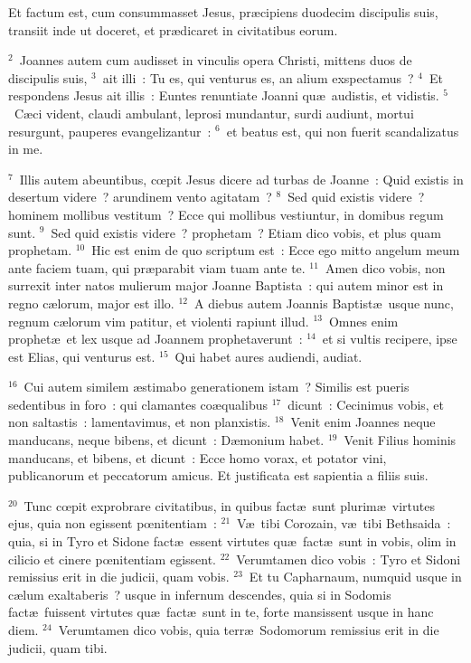 \lettrine[lines=10,image=true,loversize=0.05,lraise=-0.03]{E}{}t factum est, cum consummasset Jesus, pr\ae cipiens duodecim discipulis suis, transiit inde ut doceret, et pr\ae dicaret in civitatibus eorum.


${}^{2}$~Joannes autem cum audisset in vinculis opera Christi, mittens duos de discipulis suis,
${}^{3}$~ait illi~: Tu es, qui venturus es, an alium exspectamus~?
${}^{4}$~Et respondens Jesus ait illis~: Euntes renuntiate Joanni qu\ae\ audistis, et vidistis.
${}^{5}$~C\ae ci vident, claudi ambulant, leprosi mundantur, surdi audiunt, mortui resurgunt, pauperes evangelizantur~:
${}^{6}$~et beatus est, qui non fuerit scandalizatus in me.


${}^{7}$~Illis autem abeuntibus, cœpit Jesus dicere ad turbas de Joanne~: Quid existis in desertum videre~? arundinem vento agitatam~?
${}^{8}$~Sed quid existis videre~? hominem mollibus vestitum~? Ecce qui mollibus vestiuntur, in domibus regum sunt.
${}^{9}$~Sed quid existis videre~? prophetam~? Etiam dico vobis, et plus quam prophetam.
${}^{10}$~Hic est enim de quo scriptum est~: Ecce ego mitto angelum meum ante faciem tuam, qui pr\ae parabit viam tuam ante te.
${}^{11}$~Amen dico vobis, non surrexit inter natos mulierum major Joanne Baptista~: qui autem minor est in regno c\ae lorum, major est illo.
${}^{12}$~A diebus autem Joannis Baptist\ae\ usque nunc, regnum c\ae lorum vim patitur, et violenti rapiunt illud.
${}^{13}$~Omnes enim prophet\ae\ et lex usque ad Joannem prophetaverunt~:
${}^{14}$~et si vultis recipere, ipse est Elias, qui venturus est.
${}^{15}$~Qui habet aures audiendi, audiat.


${}^{16}$~Cui autem similem \ae stimabo generationem istam~? Similis est pueris sedentibus in foro~: qui clamantes co\ae qualibus
${}^{17}$~dicunt~: Cecinimus vobis, et non saltastis~: lamentavimus, et non planxistis.
${}^{18}$~Venit enim Joannes neque manducans, neque bibens, et dicunt~: D\ae monium habet.
${}^{19}$~Venit Filius hominis manducans, et bibens, et dicunt~: Ecce homo vorax, et potator vini, publicanorum et peccatorum amicus. Et justificata est sapientia a filiis suis.


${}^{20}$~Tunc cœpit exprobrare civitatibus, in quibus fact\ae\ sunt plurim\ae\ virtutes ejus, quia non egissent pœnitentiam~:
${}^{21}$~V\ae\ tibi Corozain, v\ae\ tibi Bethsaida~: quia, si in Tyro et Sidone fact\ae\ essent virtutes qu\ae\ fact\ae\ sunt in vobis, olim in cilicio et cinere pœnitentiam egissent.
${}^{22}$~Verumtamen dico vobis~: Tyro et Sidoni remissius erit in die judicii, quam vobis.
${}^{23}$~Et tu Capharnaum, numquid usque in c\ae lum exaltaberis~? usque in infernum descendes, quia si in Sodomis fact\ae\ fuissent virtutes qu\ae\ fact\ae\ sunt in te, forte mansissent usque in hanc diem.
${}^{24}$~Verumtamen dico vobis, quia terr\ae\ Sodomorum remissius erit in die judicii, quam tibi.


